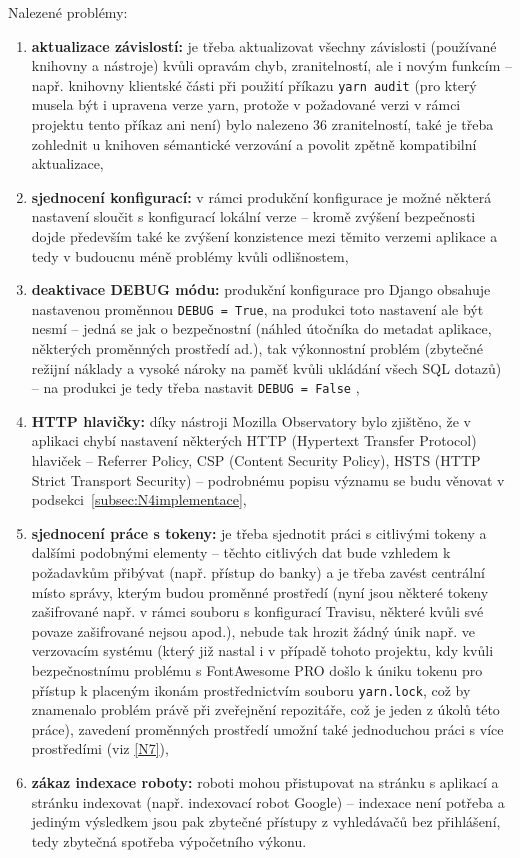 Nalezené problémy:
\begin{enumerate}[label=\textbf{B\arabic*}]
    \item \label{B1} \textbf{aktualizace závislostí:} je třeba aktualizovat všechny závislosti (používané knihovny a nástroje) kvůli opravám chyb, zranitelností, ale i novým funkcím -- např. knihovny klientské části při použití příkazu \verb|yarn audit| (pro který musela být i upravena verze yarn, protože v požadované verzi v rámci projektu tento příkaz ani není) bylo nalezeno 36 zranitelností, také je třeba zohlednit u knihoven sémantické verzování a povolit zpětně kompatibilní aktualizace,
    \item \label{B2} \textbf{sjednocení konfigurací:} v rámci produkční konfigurace je možné některá nastavení sloučit s konfigurací lokální verze -- kromě zvýšení bezpečnosti dojde především také ke zvýšení konzistence mezi těmito verzemi aplikace a tedy v budoucnu méně problémy kvůli odlišnostem,
    \item \label{B3} \textbf{deaktivace DEBUG módu:} produkční konfigurace pro 
    Django obsahuje nastavenou proměnnou \verb|DEBUG = True|, na produkci toto nastavení ale být nesmí -- jedná se jak o bezpečnostní (náhled útočníka do metadat aplikace, některých proměnných prostředí ad.), tak výkonnostní problém (zbytečné režijní náklady a vysoké nároky na paměť kvůli ukládání všech SQL dotazů) -- na produkci je tedy třeba nastavit \verb|DEBUG = False| \cite{django-debug},
    \item \label{B4} \textbf{HTTP hlavičky:} díky nástroji Mozilla Observatory bylo zjištěno, že v aplikaci chybí nastavení některých HTTP (Hypertext Transfer Protocol) hlaviček -- Referrer Policy, CSP (Content Security Policy), HSTS (HTTP Strict Transport Security) -- podrobnému popisu významu se budu věnovat v podsekci~\ref{subsec:N4implementace},
    \item \label{B5} \textbf{sjednocení práce s tokeny:} je třeba sjednotit práci s citlivými tokeny a dalšími podobnými elementy -- těchto citlivých dat bude vzhledem k požadavkům přibývat (např. přístup do banky) a je třeba zavést centrální místo správy, kterým budou proměnné prostředí (nyní jsou některé tokeny zašifrované např. v rámci souboru s konfigurací Travisu, některé kvůli své povaze zašifrované nejsou apod.), nebude tak hrozit žádný únik např. ve verzovacím systému (který již nastal i v případě tohoto projektu, kdy kvůli bezpečnostnímu problému s FontAwesome PRO \cite{fontawesome-token} došlo k úniku tokenu pro přístup k placeným ikonám prostřednictvím souboru \verb|yarn.lock|, což by znamenalo problém právě při zveřejnění repozitáře, což je jeden z úkolů této práce), zavedení proměnných prostředí umožní také jednoduchou práci s více prostředími (viz \ref{N7}),
    \item \label{B6} \textbf{zákaz indexace roboty:} roboti mohou přistupovat na stránku s aplikací a stránku indexovat (např. indexovací robot Google) -- indexace není potřeba a jediným výsledkem jsou pak zbytečné přístupy z vyhledávačů bez přihlášení, tedy zbytečná spotřeba výpočetního výkonu.
\end{enumerate}


